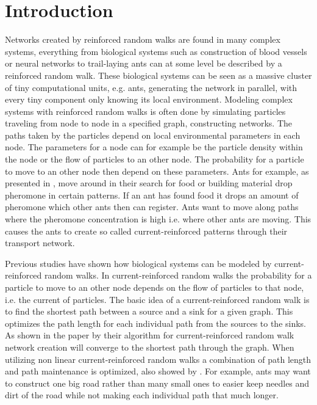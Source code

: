 \section{Introduction}
\label{sec:introduction}
Networks created by reinforced random walks are found in many complex systems, everything from biological systems such as construction of blood vessels or neural networks to trail-laying ants can at some level be described by a reinforced random walk. These biological systems can be seen as a massive cluster of tiny computational units, e.g. ants, generating the network in parallel, with every tiny component only knowing its local environment. Modeling complex systems with reinforced random walks is often done by simulating particles traveling from node to node in a specified graph, constructing networks. The paths taken by the particles depend on local environmental parameters in each node. The parameters for a node can for example be the particle density within the node or the flow of particles to an other node. The probability for a particle to move to an other node then depend on these parameters. Ants for example, as presented in \cite{Schweitzer1997153}, move around in their search for food or building material drop pheromone in certain patterns. If an ant has found food it drops an amount of pheromone which other ants then can register. Ants want to move along paths where the pheromone concentration is high i.e. where other ants are moving. This causes the ants to create so called current-reinforced patterns through their transport network.

Previous studies have shown how biological systems can be modeled by current-reinforced random walks. In current-reinforced random walks the probability for a particle to move to an other node depends on the flow of particles to that node, i.e. the current of particles. The basic idea of a current-reinforced random walk is to find the shortest path between a source and a sink for a given graph. This optimizes the path length for each individual path from the sources to the sinks. As shown in the paper by \cite{Current} their algorithm for current-reinforced random walk network creation will converge to the shortest path through the graph. When utilizing non linear current-reinforced random walks a combination of path length and path maintenance is optimized, also showed by \cite{Current}. For example, ants may want to construct one big road rather than many small ones to easier keep needles and dirt of the road while not making each individual path that much longer.

